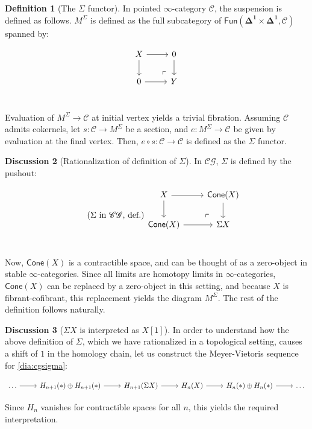 \documentclass[10pt]{amsart}
\newcommand{\8}{\ensuremath{\infty}}
\newcommand{\0}{\ensuremath{\overset{\rightarrow}{0}}}
\newcommand{\1}{\ensuremath{\mathbf{1}}}
\newcommand{\C}{\ensuremath{\mathscr{C}}}
\newcommand{\CG}{\ensuremath{\mathscr{CG}}}
\newcommand{\Simplex}[1]{\ensuremath{\boldsymbol{\Delta^{#1}}}}
\newcommand{\sq}[1]{\ensuremath{\mathsf{[#1]}}}
\newcommand{\Fun}{\ensuremath{\mathsf{Fun}}}
\newcommand{\Cone}{\ensuremath{\mathsf{Cone}}}
\theoremstyle{definition}
\newtheorem{definition}{Definition}[section]
\newtheorem{discussion}[definition]{Discussion}
\numberwithin{definition}{subsection}
\numberwithin{definition}{section}
\begin{document}
\begin{definition}[The $\Sigma$ functor]
  In pointed \8-category \C, the suspension is defined as follows. $M^\Sigma$ is defined as the full subcategory of $\Fun(\Simplex{1} \times \Simplex{1}, \C)$ spanned by:

  \begin{equation*}
    \begin{tikzcd}
      X \arrow[r] \arrow[d] \arrow[dr, phantom, "\ulcorner", very near end] & 0 \arrow[d] \\
      0 \arrow[r] & Y \\
    \end{tikzcd}
  \end{equation*}

  Evaluation of $M^\Sigma \rightarrow \C$ at initial vertex yields a trivial fibration. Assuming $\C$ admits cokernels, let $s : \C \rightarrow M^\Sigma$ be a section, and $e : M^\Sigma \rightarrow \C$ be given by evaluation at the final vertex. Then, $e \circ s : \C \rightarrow \C$ is defined as the $\Sigma$ functor.
\end{definition}

\begin{discussion}[Rationalization of definition of $\Sigma$]
  In \CG, $\Sigma$ is defined by the pushout:

  \begin{equation*}\label{dia:cgsigma}\tag{$\Sigma$ in \CG, def.}
    \begin{tikzcd}
      X \arrow[r] \arrow[d] \arrow[dr, phantom, "\ulcorner", very near end] & \Cone(X) \arrow[d] \\
      \Cone(X) \arrow[r] & \Sigma X \\
    \end{tikzcd}
  \end{equation*}

  Now, $\Cone(X)$ is a contractible space, and can be thought of as a zero-object in stable \8-categories. Since all limits are homotopy limits in \8-categories, $\Cone(X)$ can be replaced by a zero-object in this setting, and because $X$ is fibrant-cofibrant, this replacement yields the diagram $M^\Sigma$. The rest of the definition follows naturally.
\end{discussion}

\begin{discussion}[$\Sigma X$ is interpreted as $X\sq{1}$]
  In order to understand how the above definition of $\Sigma$, which we have rationalized in a topological setting, causes a shift of $1$ in the homology chain, let us construct the Meyer-Vietoris sequence for \ref{dia:cgsigma}:

  \begin{equation*}
    \begin{tikzcd}
      \ldots \arrow[r] & H_{n + 1}(*) \oplus H_{n + 1}(*) \arrow[r] & H_{n + 1}(\Sigma X) \arrow[r] & H_n(X) \arrow[r] & H_n(*) \oplus H_n(*) \arrow[r] & \ldots
    \end{tikzcd}
  \end{equation*}

  Since $H_n$ vanishes for contractible spaces for all $n$, this yields the required interpretation.
\end{discussion}
\end{document}

